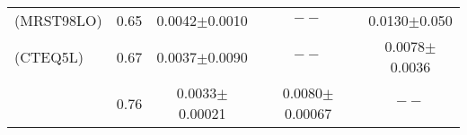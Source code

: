 \documentclass[aps,prc,preprint,superscriptaddress,showpacs,showkeys,amsmath]{revtex4-1}
\begin{document}
\begin{enumerate}
{\begin{table}[h]
\begin{tabular}{|l|c|c|c|c|}
\cite{Braaten:1999qk}(MRST98LO) &0.65                  &0.0042$\pm$0.0010           &$--$                   &0.0130$\pm$0.050\\
\cite{Braaten:1999qk}(CTEQ5L)   &0.67                  &0.0037$\pm$0.0090           &$--$                   &0.0078$\pm$0.0036\\
\cite{Sharma:2012dy}            &0.76                  &0.0033$\pm$0.00021          &0.0080$\pm$0.00067     &$--$\\
\hline
\end{tabular}
\label{table:LDMEPsi2S}
\end{table}







}
\end{enumerate}
\end{document}
